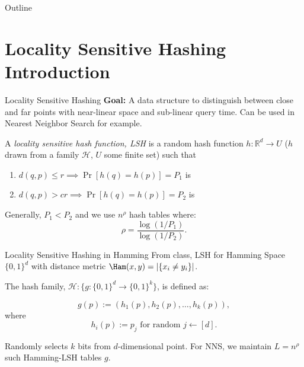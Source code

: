 \documentclass[xcolor=svgnames]{beamer}
\title[\shorttitle]{\maintitle}
\subtitle{\sbtitle}
\author[\sauthors]{\lauthors\\ \scriptsize{\em \home}}
\institute{\venue\\ \tiny{\location}}
\date[\sdate]{\scriptsize{\ldate}}
\begin{document}
\begin{frame}[plain]
	\titlepage
\end{frame}

\begin{frame}[plain]{Outline}
	\tableofcontents
\end{frame}

\section{Locality Sensitive Hashing Introduction}

\begin{frame}{Locality Sensitive Hashing}
\textbf{Goal:} A data structure to distinguish between close and far points with near-linear space and sub-linear query time. Can be used in Nearest Neighbor Search for example.

\begin{definition}[informal]
  A \emph{locality sensitive hash function, LSH} is a random hash function
  $h:\mathbb{R}^d \to U$
  ($h$ drawn from a family $\mathcal{H}$, $U$ some finite set) such that
  \begin{enumerate}
    \item $d(q,p) \leq r \implies \Pr[h(q)=h(p)] = P_1$ is 
    \item $d(q,p) > cr \implies \Pr[h(q)=h(p)] = P_2$ is 
  \end{enumerate}
  Generally, $P_1<P_2$ and we use $n^\rho$ hash tables where:
  \[ \rho = \frac{\log(1/P_1)}{\log(1/P_2)}.\]
\end{definition}
\end{frame}

\begin{frame}{Locality Sensitive Hashing in Hamming}
From class, LSH for Hamming Space $\{0,1\}^d$ with distance metric $\Ham(x,y)=|\{x_i\neq y_i\}|$.

The hash family, $\mathcal{H} : \{g:\{0,1\}^d \to \{0,1\}^k\}$, is defined as:

\[ g(p) := (h_1(p), h_2(p), \ldots, h_k(p)),\]
where
\[ h_i(p):= p_j \mbox{ for random } j \leftarrow [d].\]

Randomly selects $k$ bits from $d$-dimensional point. For NNS, we maintain $L = n^\rho$ such Hamming-LSH tables $g$.
\end{frame}
\end{document}
